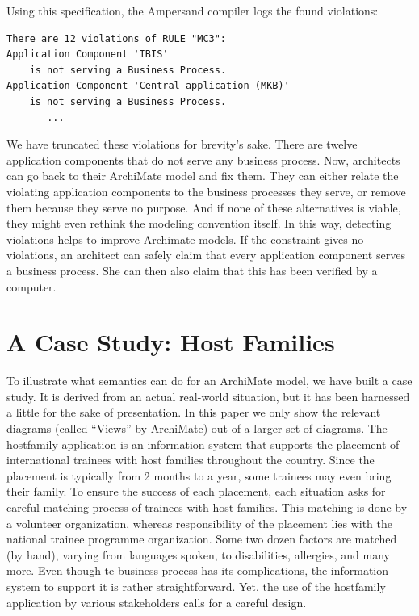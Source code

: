 \documentclass[sn-vancouver]{sn-jnl}%
\theoremstyle{thmstyleone}%
\theoremstyle{thmstyletwo}%
\theoremstyle{thmstylethree}%
\begin{document}
Using this specification, the Ampersand compiler logs the found violations:
{\small
\begin{lstlisting}[frame=single, label={log}, caption={}]
There are 12 violations of RULE "MC3":
Application Component 'IBIS'
    is not serving a Business Process.
Application Component 'Central application (MKB)'
    is not serving a Business Process.
       ...
\end{lstlisting}
}
We have truncated these violations for brevity's sake.
There are twelve application components that do not serve any business process.
Now, architects can go back to their ArchiMate model and fix them.
They can either relate the violating application components to the business processes they serve, or remove them because they serve no purpose.
And if none of these alternatives is viable, they might even rethink the modeling convention itself.
In this way, detecting violations helps to improve Archimate models.
If the constraint gives no violations, an architect can safely claim that every application component serves a business process.
She can then also claim that this has been verified by a computer.

\section{A Case Study: Host Families}\label{host families}
To illustrate what semantics can do for an ArchiMate model, we have built a case study.
It is derived from an actual real-world situation, but it has been harnessed a little for the sake of presentation.
In this paper we only show the relevant diagrams (called ``Views'' by ArchiMate) out of a larger set of diagrams.
The hostfamily application is an information system that supports the placement of international trainees with host families throughout the country.
Since the placement is typically from 2 months to a year, some trainees may even bring their family.
To ensure the success of each placement, each situation asks for careful matching process of trainees with host families.
This matching is done by a volunteer organization, whereas responsibility of the placement lies with the national trainee programme organization.
Some two dozen factors are matched (by hand), varying from languages spoken, to disabilities, allergies, and many more.
Even though te business process has its complications, the information system to support it is rather straightforward.
Yet, the use of the hostfamily application by various stakeholders calls for a careful design.
\end{document}
